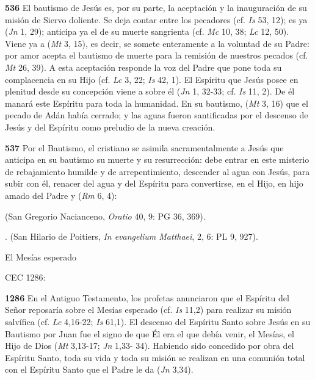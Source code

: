 {\textbf{536} El bautismo de Jesús es, por su parte, la aceptación y la inauguración de su misión de Siervo doliente. Se deja contar entre los pecadores (cf. \emph{Is} 53, 12); es ya  (\emph{Jn} 1, 29); anticipa ya el  de su muerte sangrienta (cf. \emph{Mc} 10, 38; \emph{Lc} 12, 50). Viene ya a  (\emph{Mt} 3, 15), es decir, se somete enteramente a la voluntad de su Padre: por amor acepta el bautismo de muerte para la remisión de nuestros pecados (cf. \emph{Mt} 26, 39). A esta aceptación responde la voz del Padre que pone toda su complacencia en su Hijo (cf. \emph{Lc} 3, 22; \emph{Is} 42, 1). El Espíritu que Jesús posee en plenitud desde su concepción viene a  sobre él (\emph{Jn} 1, 32-33; cf. \emph{Is} 11, 2). De él manará este Espíritu para toda la humanidad. En su bautismo,  (\emph{Mt} 3, 16) que el pecado de Adán había cerrado; y las aguas fueron santificadas por el descenso de Jesús y del Espíritu como preludio de la nueva creación.

\textbf{537} Por el Bautismo, el cristiano se asimila sacramentalmente a Jesús que anticipa en su bautismo su muerte y su resurrección: debe entrar en este misterio de rebajamiento humilde y de arrepentimiento, descender al agua con Jesús, para subir con él, renacer del agua y del Espíritu para convertirse, en el Hijo, en hijo amado del Padre y  (\emph{Rm} 6, 4):

 (San Gregorio Nacianceno, \emph{Oratio} 40, 9: PG 36, 369).

. (San Hilario de Poitiers, \emph{In evangelium Matthaei}, 2, 6: PL 9, 927).

El Mesías esperado

CEC 1286:

\textbf{1286} En el Antiguo Testamento, los profetas anunciaron que el Espíritu del Señor reposaría sobre el Mesías esperado (cf. \emph{Is} 11,2) para realizar su misión salvífica (cf. \emph{Lc} 4,16-22; \emph{Is} 61,1). El descenso del Espíritu Santo sobre Jesús en su Bautismo por Juan fue el signo de que Él era el que debía venir, el Mesías, el Hijo de Dios (\emph{Mt} 3,13-17; \emph{Jn} 1,33- 34). Habiendo sido concedido por obra del Espíritu Santo, toda su vida y toda su misión se realizan en una comunión total con el Espíritu Santo que el Padre le da  (\emph{Jn} 3,34).

}
